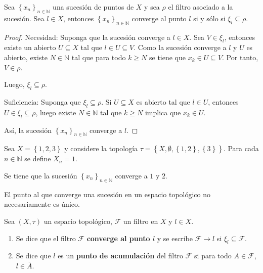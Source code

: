 \documentclass[12pt]{report}
\theoremstyle{largebreak}
\newcommand{\Cls}[1]{\ensuremath{\overline{#1}}}
\begin{document}
    \begin{propo}
        Sea $\left\{x_n \right\}_{ n\in\mathbb{N}}$ una sucesión de puntos de $X$ y sea $\rho$ el filtro asociado a la sucesión. Sea $l\in X$, entonces $\left\{x_n \right\}_{ n\in\mathbb{N}}$ converge al punto $l$ si y sólo si $\xi_l\subseteq \rho$.        
    \end{propo}

    \begin{proof}
        Necesidad: Suponga que la sucesión converge a $l\in X$. Sea $V\in\xi_l$, entonces existe un abierto $U\subseteq X$ tal que $l\in U\subseteq V$. Como la sucesión converge a $l$ y $U$ es abierto, existe $N\in\mathbb{N}$ tal que para todo $k\geq N$ se tiene que $x_k\in U\subseteq V$. Por tanto, $V\in\rho$.

        Luego, $\xi_l\subseteq\rho$.

        Suficiencia: Suponga que $\xi_l\subseteq\rho$. Si $U\subseteq X$ es abierto tal que $l\in U$, entonces $U\in\xi_l\subseteq \rho$, luego existe $N\in\mathbb{N}$ tal que $k\geq N$ implica que $x_k\in U$.

        Así, la sucesión $\left\{x_n \right\}_{ n\in\mathbb{N}}$ converge a $l$.
    \end{proof}

    \begin{exa}
        Sea $X=\left\{1,2,3 \right\}$ y considere la topología $\tau=\left\{X,\emptyset,\left\{1,2 \right\},\left\{3\right\} \right\}$. Para cada $n\in\mathbb{N}$ se define $X_n=1$.

        Se tiene que la sucesión $\left\{x_n\right\}_{ n\in\mathbb{N}}$ converge a $1$ y $2$.
    \end{exa}

    \begin{obs}
        El punto al que converge una sucesión en un espacio topológico no necesariamente es único.
    \end{obs}

    \begin{mydef}
        Sea $(X,\tau)$ un espacio topológico, $\mathcal{F}$ un filtro en $X$ y $l\in X$.
        \begin{enumerate}
            \item Se dice que el filtro $\mathcal{F}$ \textbf{converge al punto $l$} y se escribe $\mathcal{F}\rightarrow l$ si $\xi_l\subseteq\mathcal{F}$.
            \item Se dice que $l$ es un \textbf{punto de acumulación} del filtro $\mathcal{F}$ si para todo $A\in\mathcal{F}$, $l\in\Cls{A}$.
       \end{enumerate}
    \end{mydef}
\end{document}
